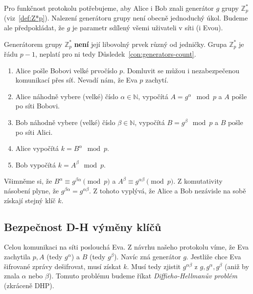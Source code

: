 \documentclass[
  program=infoi,
  biblatex,
  figures=false,
  glossaries,
  index
]{kidiplom}
\begin{document}
        Pro funkčnost protokolu potřebujeme, aby Alice i Bob znali generátor $g$ grupy $\mathbb{Z}^*_p$ (viz~\ref{def:Z*p}).
        Nalezení generátoru grupy není obecně jednoduchý úkol.
        Budeme ale předpokládat, že $g$ je parametr sdílený všemi uživateli v síti (i Evou).

        \begin{remark}
            Generátorem grupy $\mathbb{Z}^*_p$ \textbf{není} její libovolný prvek různý od jedničky.
            Grupa $\mathbb{Z}^*_p$ je řádu $p-1$, neplatí pro ni tedy Důsledek~\ref{con:generators-count}.
        \end{remark}

        \begin{enumerate}
            \item
                Alice pošle Bobovi velké prvočíslo $p$.
                Domluvit se můžou i nezabezpečenou komunikací přes síť. Nevadí nám, že Eva $p$ zachytí.
            \item
                Alice náhodně vybere (velké) číslo $\alpha \in \mathbb{N}$, vypočítá $A=g^\alpha \mod{p}$ a $A$ pošle po síti Bobovi.
            \item
                Bob náhodně vybere (velké) číslo $\beta \in \mathbb{N}$, vypočítá $B=g^\beta \mod{p}$ a $B$ pošle po síti Alici.
            \item
                Alice vypočítá $k=B^\alpha \mod{p}$.
            \item
                Bob vypočítá $k=A^\beta \mod{p}$.

        \end{enumerate}

        Všimněme si, že $B^\alpha \equiv g^{\beta \alpha} \pmod{p}$ a $A^\beta \equiv g^{\alpha \beta} \pmod{p}$. Z komutativity násobení
        plyne, že $g^{\beta \alpha} = g^{\alpha \beta}$. Z tohoto vyplývá, že Alice a Bob nezávisle na sobě získají stejný klíč $k$.


    \subsection{Bezpečnost D-H výměny klíčů}\label{sub:diffie-hellman-security}

        Celou komunikaci na síti poslouchá Eva. Z návrhu našeho protokolu víme, že Eva zachytila $p, A$ (tedy $g^\alpha$) a $B$ (tedy $g^\beta$).
        Navíc zná generátor $g$.
        Jestliže chce Eva šifrované zprávy dešifrovat, musí získat $k$.
        Musí tedy zjistit $g^{\alpha \beta}$ z $g, g^\alpha, g^\beta$ (aniž by znala $\alpha$ nebo $\beta$).
        Tomuto problému budeme říkat \emph{Diffieho-Hellmanův problém} (zkráceně DHP).
\end{document}
